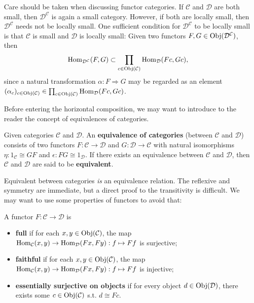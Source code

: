 	\begin{remark}
	Care should be taken when discussing functor categories. If $\mathcal{C}$ and $\mathcal{D}$ are both small, then $\mathcal{D}^\mathcal{C}$ is again a small category. However, if both are locally small, then $\mathcal{D}^\mathcal{C}$ needs not be locally small. One sufficient condition for $\mathcal{D}^\mathcal{C}$ to be locally small is that $\mathcal{C}$ is small and $\mathcal{D}$ is locally small: Given two functors $F,G\in\operatorname{Obj}(\mathcal{D}^\mathcal{C})$, then
	\[\operatorname{Hom}_{\mathcal{D}^\mathcal{C}}(F,G)\subset \prod_{c\in\operatorname{Obj}(\mathcal{C})}\operatorname{Hom}_\mathcal{D}(Fc,Gc),\]
	since a natural transformation $\alpha:F\Rightarrow G$ may be regarded as an element $(\alpha_c)_{c\in\operatorname{Obj}(\mathcal{C})}\in\prod_{c\in\operatorname{Obj}(\mathcal{C})}\operatorname{Hom}_\mathcal{D}(Fc,Gc)$.
	\end{remark}
	Before entering the horizontal composition, we may want to introduce to the reader the concept of equivalences of categories. 
	\begin{definition}
	Given categories $\mathcal{C}$ and $\mathcal{D}$. An \textbf{equivalence of categories} (between $\mathcal{C}$ and $\mathcal{D}$) consists of two functors $F:\mathcal{C}\to\mathcal{D}$ and $G:\mathcal{D}\to\mathcal{C}$ with natural isomorphisms $\eta:1_\mathcal{C}\cong GF$ and $\epsilon:FG\cong 1_\mathcal{D}$. If there exists an equivalence between $\mathcal{C}$ and $\mathcal{D}$, then $\mathcal{C}$ and $\mathcal{D}$ are said to be \textbf{equivalent}. 
	\end{definition}
	Equivalent between categories \textsl{is} an equivalence relation. The reflexive and symmetry are immediate, but a direct proof to the transitivity is difficult. We may want to use some properties of functors to avoid that:
	\begin{definition}
	A functor $F:\mathcal{C}\to \mathcal{D}$ is
		\begin{itemize}
			\item \textbf{full} if for each $x,y\in\operatorname{Obj}(\mathcal{C})$, the map $\operatorname{Hom}_\mathcal{C}(x,y)\to\operatorname{Hom}_\mathcal{D}(Fx,Fy):f\mapsto Ff$ is surjective;
			\item \textbf{faithful} if for each $x,y\in\operatorname{Obj}(\mathcal{C})$, the map $\operatorname{Hom}_\mathcal{C}(x,y)\to\operatorname{Hom}_\mathcal{D}(Fx,Fy):f\mapsto Ff$ is injective;
			\item \textbf{essentially surjective on objects} if for every object $d\in\operatorname{Obj}(\mathcal{D})$, there exists some $c\in\operatorname{Obj}(\mathcal{C})$ s.t. $d\cong Fc$.
		\end{itemize}
	\end{definition}
